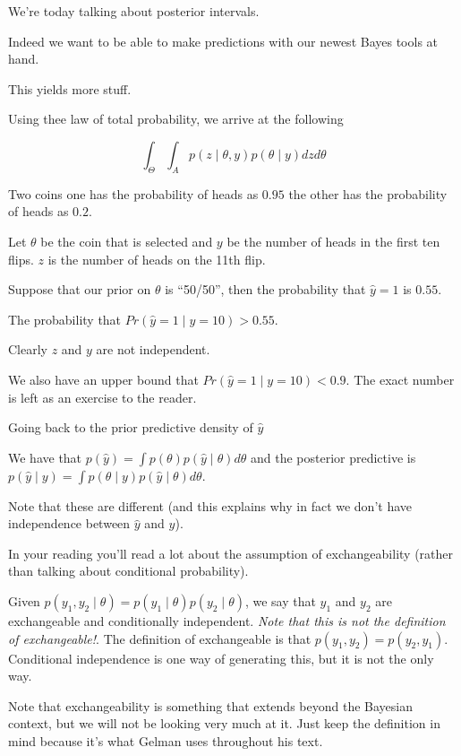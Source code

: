 \documentclass[a4paper]{article}
\begin{document}
We're today talking about posterior intervals.

Indeed we want to be able to make predictions with our newest Bayes tools at hand.


This yields more stuff.


Using thee law of total probability, we arrive at the following


\[
	\int _\Theta \int _A p(z \mid \theta, y) p(\theta \mid y) dz d\theta
\]


Two coins one has the probability of heads as $0.95$ the other has the probability of heads as $0.2$.

Let $\theta$ be the coin that is selected and $y$ be the number of heads in the first ten flips. $z$ is the number of heads on the 11th flip.

Suppose that our prior on $\theta$ is ``50/50'', then the probability that $\hat{y} = 1$ is $0.55$.

The probability that $Pr(\hat{y} = 1 \mid y = 10) > 0.55$.

Clearly $z$ and $y$ are not independent.

We also have an upper bound that $Pr(\hat{y} = 1 \mid y = 10) < 0.9$. The exact number is left as an exercise to the reader.

Going back to the prior predictive density of $\hat{y}$

We have that $p(\hat{y}) = \int p(\theta) p (\hat{y} \mid \theta) d\theta$ and the posterior predictive is $p(\hat{y} \mid y) = \int p (\theta \mid y) p (\hat{y} \mid \theta) d\theta$.

Note that these are different (and this explains why in fact we don't have independence between $\hat{y}$ and $y$).

In your reading you'll read a lot about the assumption of exchangeability (rather than talking about conditional probability).

Given $p(y_1, y_2 \mid \theta) = p(y_1 \mid \theta) p(y_2 \mid \theta)$, we say that $y_1$ and $y_2$ are exchangeable and conditionally independent. \emph{Note that this is not the definition of exchangeable!}. The definition of exchangeable is that $p(y_1, y_2) = p(y_2, y_1)$. Conditional independence is one way of generating this, but it is not the only way.

Note that exchangeability is something that extends beyond the Bayesian context, but we will not be looking very much at it. Just keep the definition in mind because it's what Gelman uses throughout his text.
\end{document}
